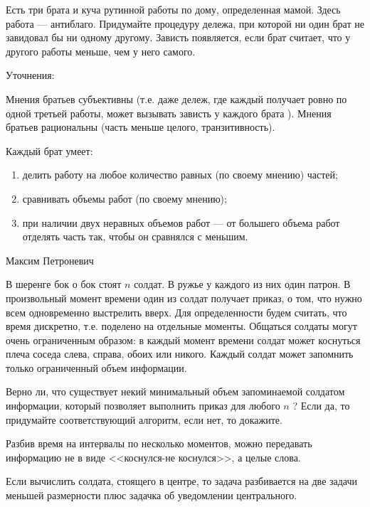 \begin{problem}

Есть три брата и куча рутинной работы по дому, определенная мамой. Здесь работа --- антиблаго. Придумайте процедуру дележа, при которой ни один брат не завидовал бы ни одному другому. Зависть появляется, если брат считает, что у другого работы меньше, чем у него самого. \par
Уточнения: \par
Мнения братьев субъективны (т.е. даже дележ, где каждый получает ровно по одной третьей работы, может вызывать зависть у каждого брата ). Мнения братьев рациональны (часть меньше целого, транзитивность). \par
Каждый брат умеет: 
\begin{enumerate}
\item  делить работу на любое количество равных (по своему мнению) частей; 
\item сравнивать объемы работ (по своему мнению); 
\item  при наличии двух неравных объемов работ --- от большего объема работ отделять часть так, чтобы он сравнялся с меньшим\cite{peterson:epefcd}.
\end{enumerate}


\begin{sol}

\end{sol}
\end{problem}



\begin{problem}
\begin{source}
Максим Петроневич
\end{source}
В шеренге бок о бок стоят  $n$  солдат. В ружье у каждого из них один патрон. В произвольный момент времени один из солдат получает приказ, о том, что нужно всем одновременно выстрелить вверх. Для определенности будем считать, что время дискретно, т.е. поделено на отдельные моменты. Общаться солдаты могут очень ограниченным образом: в каждый момент времени солдат может коснуться плеча соседа слева, справа, обоих или никого. Каждый солдат может запомнить только ограниченный объем информации.\par
Верно ли, что существует некий минимальный объем запоминаемой солдатом информации, который позволяет выполнить приказ для любого  $n$ ? Если да, то придумайте соответствующий алгоритм, если нет, то докажите.



\begin{sol}

Разбив время на интервалы по несколько моментов, можно передавать информацию не в виде <<коснулся-не коснулся>>, а целые слова.\par
Если вычислить солдата, стоящего в центре, то задача разбивается на две задачи меньшей размерности плюс задачка об уведомлении центрального.
\end{sol}
\end{problem}







